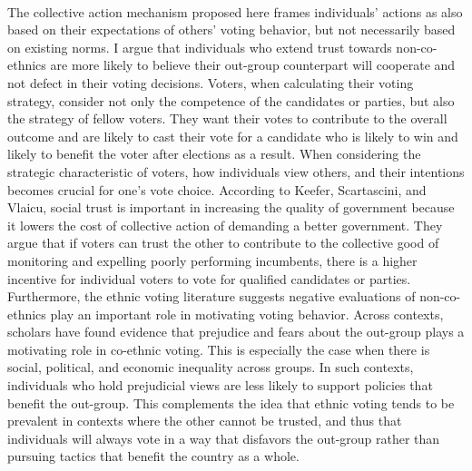 \documentclass[a4paper, 12pt]{article}
\begin{document}
\paragraph{}
The collective action mechanism proposed here frames individuals’ actions as also based on their expectations of others’ voting behavior, but not necessarily based on existing norms. I argue that individuals who extend trust towards non-co-ethnics are more likely to believe their out-group counterpart will cooperate and not defect in their voting decisions. Voters, when calculating their voting strategy, consider not only the competence of the candidates or parties, but also the strategy of fellow voters. They want their votes to contribute to the overall outcome and are likely to cast their vote for a candidate who is likely to win and likely to benefit the voter after elections as a result. When considering the strategic characteristic of voters, how individuals view others, and their intentions becomes crucial for one’s vote choice. According to Keefer, Scartascini, and Vlaicu\cite{keeferSocialTrustElectoral2019}, social trust is important in increasing the quality of government because it lowers the cost of collective action of demanding a better government. They argue that if voters can trust the other to contribute to the collective good of monitoring and expelling poorly performing incumbents, there is a higher incentive for individual voters to vote for qualified candidates or parties. Furthermore, the ethnic voting literature suggests negative evaluations of non-co-ethnics play an important role in motivating voting behavior. Across contexts, scholars have found evidence that prejudice and fears about the out-group plays a motivating role in co-ethnic voting\cite{kinderPrejudicePoliticsSymbolic1981, longDeterminantsEthnicVoting2012}. This is especially the case when there is social, political, and economic inequality across groups\cite{batesEthnicCompetitionModernization1974}. In such contexts, individuals who hold prejudicial views are less likely to support policies that benefit the out-group\cite{snidermanFallacyDemocraticElitism1991}. This complements the idea that ethnic voting tends to be prevalent in contexts where the other cannot be trusted, and thus that individuals will always vote in a way that disfavors the out-group rather than pursuing tactics that benefit the country as a whole.
\end{document}

